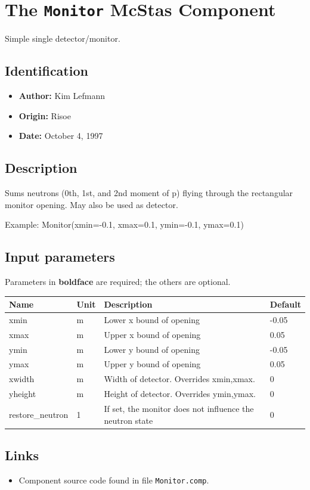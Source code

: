 \section{The \texttt{Monitor} McStas Component}
Simple single detector/monitor.

\subsection*{Identification}
\begin{itemize}
  \item \textbf{Author:} Kim Lefmann
  \item \textbf{Origin:} Risoe
  \item \textbf{Date:} October 4, 1997
\end{itemize}

\subsection*{Description}
Sums neutrons (0th, 1st, and 2nd moment of p) flying through the rectangular monitor opening. May also be used as detector.

Example: Monitor(xmin=-0.1, xmax=0.1, ymin=-0.1, ymax=0.1)

\subsection*{Input parameters}
Parameters in \textbf{boldface} are required; the others are optional.

\begin{longtable}{p{}p{}p{}p{}}
\toprule
\textbf{Name} & \textbf{Unit} & \textbf{Description} & \textbf{Default} \\
\midrule
\endhead
xmin & m & Lower x bound of opening & -0.05 \\
xmax & m & Upper x bound of opening & 0.05 \\
ymin & m & Lower y bound of opening & -0.05 \\
ymax & m & Upper y bound of opening & 0.05 \\
xwidth & m & Width of detector. Overrides xmin,xmax. & 0 \\
yheight & m & Height of detector. Overrides ymin,ymax. & 0 \\
restore\_neutron & 1 & If set, the monitor does not influence the neutron state & 0 \\
\bottomrule
\end{longtable}

\subsection*{Links}
\begin{itemize}
  \item Component source code found in file \texttt{Monitor.comp}.
\end{itemize}
